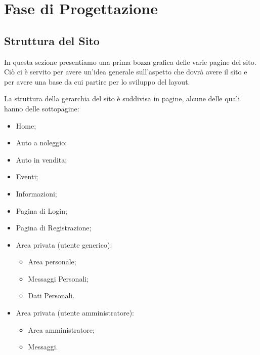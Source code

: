 \section{Fase di Progettazione}
    \subsection{Struttura del Sito}
    In questa sezione presentiamo una prima bozza grafica delle varie pagine del sito. Ciò ci è servito per avere un'idea generale sull'aspetto che dovrà avere il sito e per avere una base da cui partire per lo sviluppo del layout.
        
    La struttura della gerarchia del sito è suddivisa in pagine, alcune delle quali hanno delle sottopagine:
    \begin{itemize}
        \item Home;
        \item Auto a noleggio;
        \item Auto in vendita;
        \item Eventi;
        \item Informazioni;
        \item Pagina di Login;
        \item Pagina di Registrazione;
        \item Area privata (utente generico):
            \begin{itemize}
                \item Area personale;
                \item Messaggi Personali;
                \item Dati Personali.
            \end{itemize}
            \item Area privata (utente amministratore):
                \begin{itemize}
                    \item Area amministratore;
                    \item Messaggi.
                \end{itemize}
    \end{itemize}

